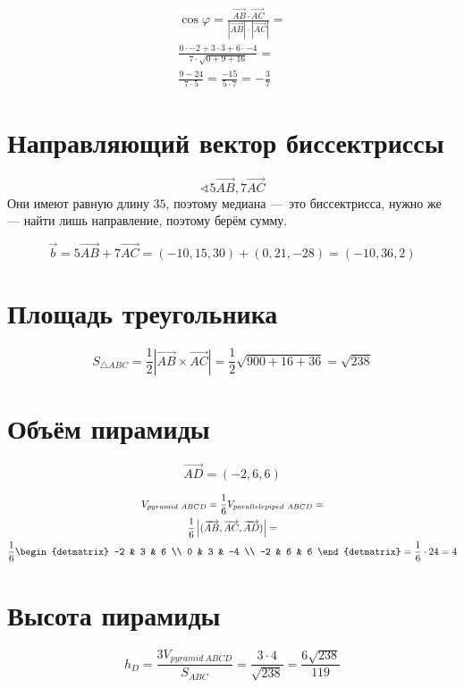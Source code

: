 \documentclass[12pt, a4paper]{article}
\begin{document}
    \begin{multline}
        \cos \varphi = \frac{\overrightarrow{AB} \cdot \overrightarrow{AC}}{|\overrightarrow{AB}| \cdot |\overrightarrow{AC}|} = \\
        \frac{0 \cdot -2 + 3 \cdot 3 + 6 \cdot -4}{7 \cdot \sqrt{0 + 9 + 16}} = \\
        \frac{9 - 24}{7 \cdot 5} = \frac{-15}{5 \cdot 7} = -\frac{3}{7}
    \end{multline}

    \section{Направляющий вектор биссектриссы}

    \begin{equation}
        \sphericalangle 5\overrightarrow{AB}, 7\overrightarrow{AC}
    \end{equation}
    Они имеют равную длину $35$, поэтому медиана — это биссектрисса, нужно же — найти лишь направление, поэтому берём сумму.

    \begin{equation}
        \vec{b} = 5\overrightarrow{AB} + 7\overrightarrow{AC} = (-10, 15, 30) + (0, 21, -28) = (-10, 36, 2)
    \end{equation}


    \section{Площадь треугольника}
    
    \begin{equation}
        S_{\triangle ABC} = \frac{1}{2} \left| \overrightarrow{AB} \times \overrightarrow{AC} \right| = \frac{1}{2} \sqrt{900 + 16 + 36} = \sqrt{238}
    \end{equation}


    \section{Объём пирамиды}
    
    \begin{equation}
        \overrightarrow{AD} = (-2, 6, 6)
    \end{equation}

    \begin{multline}
        V_{pyramid ~ ABCD} = \frac{1}{6} V_{parallelepiped ~ ABCD} = \\
        \frac{1}{6} \left|(\overrightarrow{AB}, \overrightarrow{AC}, \overrightarrow{AD})\right| = \\
        \frac{1}{6} \begin{detmatrix}
            -2 & 3 & 6 \\
            0 & 3 & -4 \\
            -2 & 6 & 6
        \end{detmatrix} = \frac{1}{6} \cdot 24 = 4
    \end{multline}

    \section{Высота пирамиды}

    \begin{equation}
        h_{D} = \frac{3 V_{pyramid ~ ABCD}}{S_{ABC}} = \frac{3 \cdot 4}{\sqrt{238}} = \frac{6 \sqrt{238}}{119}
    \end{equation}
\end{document}
